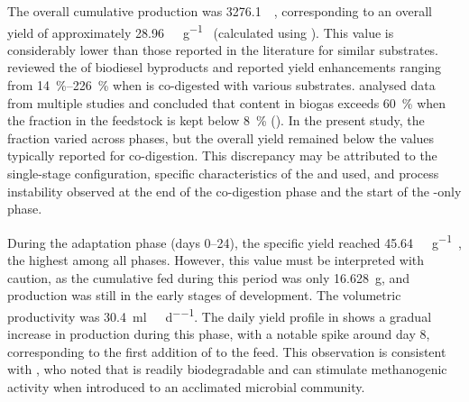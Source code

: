 The overall cumulative  production was \qty[round-mode = places, round-precision = 0]{3276.1}{\nml\CH}, corresponding to an overall yield of approximately \qty[round-mode = places, round-precision = 0]{28.96}{\nml\CH\per\gram\VSfed} (calculated using ). This value is considerably lower than those reported in the literature for similar substrates. \textcite{gebreegziabher2025} reviewed the  of biodiesel byproducts and reported  yield enhancements ranging from \qtyrange{14}{226}{\percent} when  is co-digested with various substrates. \textcite{tomczak2025} analysed data from multiple studies and concluded that  content in biogas exceeds \qty{60}{\percent} when the  fraction in the feedstock is kept below \qty{8}{\percent} (). In the present study, the  fraction varied across phases, but the overall  yield remained below the values typically reported for  co-digestion. This discrepancy may be attributed to the single-stage configuration, specific characteristics of the  and  used, and process instability observed at the end of the co-digestion phase and the start of the -only phase.

During the adaptation phase (days \numrange[parse-numbers=false]{0}{24}), the specific  yield reached \qty{45.64}{\nml\CH\per\gram\VSfed}, the highest among all phases. However, this value must be interpreted with caution, as the cumulative  fed during this period was only \qty{16.628}{\gram}, and  production was still in the early stages of development. The volumetric productivity was \qty{30.4}{\milli\litre\CH\per\reactorlitre\per\day}. The daily yield profile in  shows a gradual increase in  production during this phase, with a notable spike around day \num[parse-numbers=false]{8}, corresponding to the first addition of  to the feed. This observation is consistent with \textcite{gebreegziabher2025}, who noted that  is readily biodegradable and can stimulate methanogenic activity when introduced to an acclimated microbial community.

